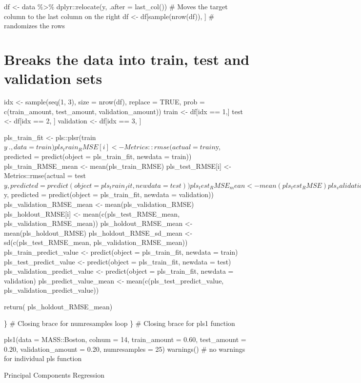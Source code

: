 \documentclass[
]{book}
\begin{document}
df \textless- data \%\textgreater\% dplyr::relocate(y, .after = last\_col()) \# Moves the
target column to the last column on the right df \textless-
df{[}sample(nrow(df)), {]} \# randomizes the rows

\chapter{Breaks the data into train, test and validation sets}\label{breaks-the-data-into-train-test-and-validation-sets-10}

idx \textless- sample(seq(1, 3), size = nrow(df), replace = TRUE, prob =
c(train\_amount, test\_amount, validation\_amount)) train \textless- df{[}idx == 1,{]} test \textless- df{[}idx == 2, {]} validation \textless- df{[}idx == 3, {]}

pls\_train\_fit \textless- pls::plsr(train\(y ~ ., data = train)
  pls_train_RMSE[i] <- Metrics::rmse(actual = train\)y, predicted =
predict(object = pls\_train\_fit, newdata = train)) pls\_train\_RMSE\_mean
\textless- mean(pls\_train\_RMSE) pls\_test\_RMSE{[}i{]} \textless- Metrics::rmse(actual =
test\(y, predicted = predict(object = pls_train_fit, newdata = test))
  pls_test_RMSE_mean <- mean(pls_test_RMSE)
  pls_validation_RMSE[i] <- Metrics::rmse(actual = validation\)y,
predicted = predict(object = pls\_train\_fit, newdata = validation))
pls\_validation\_RMSE\_mean \textless- mean(pls\_validation\_RMSE)
pls\_holdout\_RMSE{[}i{]} \textless- mean(c(pls\_test\_RMSE\_mean,
pls\_validation\_RMSE\_mean)) pls\_holdout\_RMSE\_mean \textless-
mean(pls\_holdout\_RMSE) pls\_holdout\_RMSE\_sd\_mean \textless-
sd(c(pls\_test\_RMSE\_mean, pls\_validation\_RMSE\_mean))
pls\_train\_predict\_value \textless- predict(object = pls\_train\_fit, newdata =
train) pls\_test\_predict\_value \textless- predict(object = pls\_train\_fit,
newdata = test) pls\_validation\_predict\_value \textless- predict(object =
pls\_train\_fit, newdata = validation) pls\_predict\_value\_mean \textless-
mean(c(pls\_test\_predict\_value, pls\_validation\_predict\_value))

return( pls\_holdout\_RMSE\_mean)

\} \# Closing brace for numresamples loop \} \# Closing brace for pls1
function

pls1(data = MASS::Boston, colnum = 14, train\_amount = 0.60, test\_amount
= 0.20, validation\_amount = 0.20, numresamples = 25) warnings() \# no
warnings for individual pls function

Principal Components Regression
\end{document}
